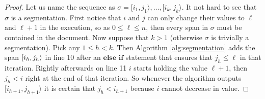 
\begin{proof}
	Let us name the sequence as $\sigma = [i_1, j_1\rangle, \ldots, [i_k, j_k\rangle$. It not hard to see that $\sigma$ is a segmentation. First notice that $i$ and $j$ can only change their values to $\ell$ and $\ell + 1$ in the execution, so as $ 0 \leq \ell \leq n$, then every span in $\sigma$ must be contained in the document. Now suppose that $k > 1$ (otherwise $\sigma$ is trivially a segmentation). Pick any $1 \leq h < k$. Then Algorithm \ref*{alg:segmentation} adds the span $[i_h, j_h\rangle$ in line 10 after an $\textbf{else if}$ statement that ensures that $j_h \leq \ell$ in that iteration. Rightly afterwards on line 11 $i$ starts holding the value $\ell + 1$, then $j_h < i$ right at the end of that iteration. So whenever the algorithm outputs $[i_{h+1}, j_{h+1}\rangle$ it is certain that $j_h < i_{h+1}$ because $i$ cannot decrease in value. 


\end{proof}
